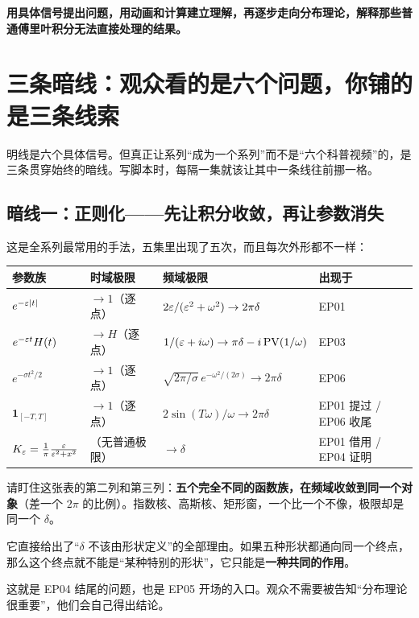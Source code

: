 \begin{scriptbox}[写作时可以直接用的一句总纲]
\textbf{用具体信号提出问题，用动画和计算建立理解，再逐步走向分布理论，解释那些普通傅里叶积分无法直接处理的结果。}
\end{scriptbox}

\section{三条暗线：观众看的是六个问题，你铺的是三条线索}

明线是六个具体信号。但真正让系列“成为一个系列”而不是“六个科普视频”的，是三条贯穿始终的暗线。写脚本时，每隔一集就该让其中一条线往前挪一格。

\subsection*{暗线一：正则化——先让积分收敛，再让参数消失}

这是全系列最常用的手法，五集里出现了五次，而且每次外形都不一样：

\begin{center}
\small
\renewcommand{\arraystretch}{1.45}
\begin{tabularx}{\textwidth}{@{}L{2.9cm}L{2.5cm}L{4.6cm}L{4.4cm}@{}}
\toprule
参数族 & 时域极限 & 频域极限 & 出现于 \\
\midrule
$e^{-\varepsilon|t|}$ & $\to 1$（逐点） & $2\varepsilon/(\varepsilon^{2}+\omega^{2})\to 2\pi\delta$ & EP01 \\
$e^{-\varepsilon t}H(t)$ & $\to H$（逐点） & $1/(\varepsilon+i\omega)\to\pi\delta-i\operatorname{PV}(1/\omega)$ & EP03 \\
$e^{-\sigma t^{2}/2}$ & $\to 1$（逐点） & $\sqrt{2\pi/\sigma}\,e^{-\omega^{2}/(2\sigma)}\to 2\pi\delta$ & EP06 \\
$\mathbf{1}_{[-T,T]}$ & $\to 1$（逐点） & $2\sin(T\omega)/\omega\to 2\pi\delta$ & EP01 提过 / EP06 收尾 \\
$K_{\varepsilon}=\frac{1}{\pi}\frac{\varepsilon}{\varepsilon^{2}+x^{2}}$ & （无普通极限） & $\to\delta$ & EP01 借用 / EP04 证明 \\
\bottomrule
\end{tabularx}
\end{center}

请盯住这张表的第二列和第三列：\textbf{五个完全不同的函数族，在频域收敛到同一个对象}（差一个 $2\pi$ 的比例）。指数核、高斯核、矩形窗，一个比一个不像，极限却是同一个 $\delta$。

\begin{ideabox}[这条暗线的意义]
它直接给出了“$\delta$ 不该由形状定义”的全部理由。如果五种形状都通向同一个终点，那么这个终点就不能是“某种特别的形状”，它只能是\textbf{一种共同的作用}。

这就是 EP04 结尾的问题，也是 EP05 开场的入口。观众不需要被告知“分布理论很重要”，他们会自己得出结论。
\end{ideabox}

